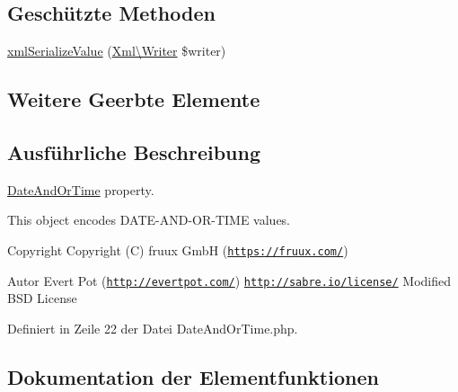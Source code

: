 \subsection*{Geschützte Methoden}
\begin{DoxyCompactItemize}
\item 
\mbox{\hyperlink{class_sabre_1_1_v_object_1_1_property_1_1_v_card_1_1_date_and_or_time_a22d0a4ce399a76c19bd54114042cdc4a}{xml\+Serialize\+Value}} (\mbox{\hyperlink{class_sabre_1_1_xml_1_1_writer}{Xml\textbackslash{}\+Writer}} \$writer)
\end{DoxyCompactItemize}
\subsection*{Weitere Geerbte Elemente}


\subsection{Ausführliche Beschreibung}
\mbox{\hyperlink{class_sabre_1_1_v_object_1_1_property_1_1_v_card_1_1_date_and_or_time}{Date\+And\+Or\+Time}} property.

This object encodes D\+A\+T\+E-\/\+A\+N\+D-\/\+O\+R-\/\+T\+I\+ME values.

\begin{DoxyCopyright}{Copyright}
Copyright (C) fruux GmbH (\href{https://fruux.com/}{\tt https\+://fruux.\+com/}) 
\end{DoxyCopyright}
\begin{DoxyAuthor}{Autor}
Evert Pot (\href{http://evertpot.com/}{\tt http\+://evertpot.\+com/})  \href{http://sabre.io/license/}{\tt http\+://sabre.\+io/license/} Modified B\+SD License 
\end{DoxyAuthor}


Definiert in Zeile 22 der Datei Date\+And\+Or\+Time.\+php.



\subsection{Dokumentation der Elementfunktionen}
\mbox{\label{class_sabre_1_1_v_object_1_1_property_1_1_v_card_1_1_date_and_or_time_ab114fe88283fdf00e3a140fb55b87ef6}} 
